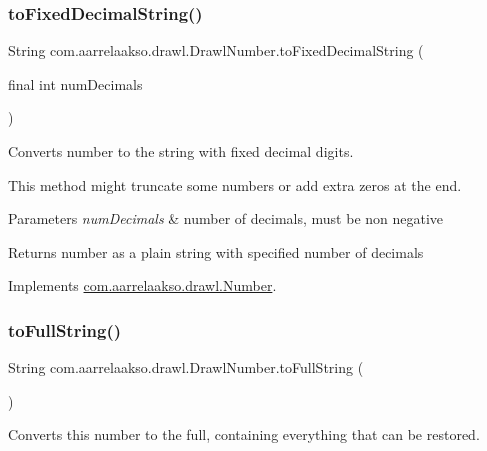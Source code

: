 \subsubsection{\texorpdfstring{to\+Fixed\+Decimal\+String()}{toFixedDecimalString()}}
{\footnotesize\ttfamily String com.\+aarrelaakso.\+drawl.\+Drawl\+Number.\+to\+Fixed\+Decimal\+String (\begin{DoxyParamCaption}\item[{final int}]{num\+Decimals }\end{DoxyParamCaption})}



Converts number to the string with fixed decimal digits. 

This method might truncate some numbers or add extra zeros at the end.


\begin{DoxyParams}{Parameters}
{\em num\+Decimals} & number of decimals, must be non negative \\
\hline
\end{DoxyParams}
\begin{DoxyReturn}{Returns}
number as a plain string with specified number of decimals 
\end{DoxyReturn}


Implements \hyperlink{interfacecom_1_1aarrelaakso_1_1drawl_1_1_number_a8e672210b2f919571e6b09d4cb95c569}{com.\+aarrelaakso.\+drawl.\+Number}.

\mbox{\label{classcom_1_1aarrelaakso_1_1drawl_1_1_drawl_number_afa8d185aa5f961e7d54e62c96d788660}} 
\subsubsection{\texorpdfstring{to\+Full\+String()}{toFullString()}}
{\footnotesize\ttfamily String com.\+aarrelaakso.\+drawl.\+Drawl\+Number.\+to\+Full\+String (\begin{DoxyParamCaption}{ }\end{DoxyParamCaption})}



Converts this number to the full, containing everything that can be restored. 

